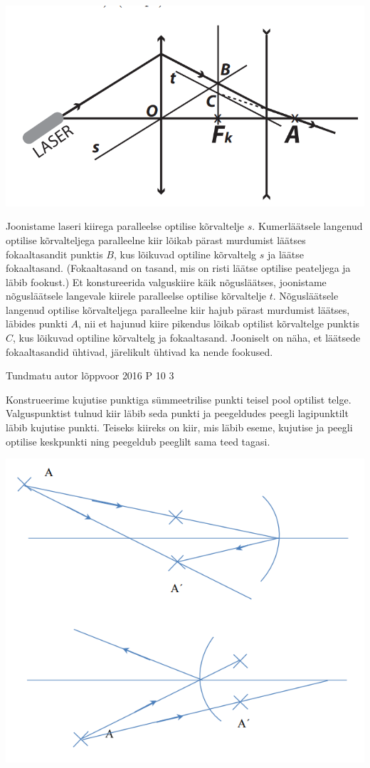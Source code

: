 \documentclass[11pt]{article}
\begin{document}
{{\ifSolution
\begin{center}
	\includegraphics[width=0.5\linewidth]{2016-v2p-08-lah.PNG}
\end{center}
Joonistame laseri kiirega paralleelse optilise kõrvaltelje $s$. Kumerläätsele langenud optilise kõrvalteljega paralleelne kiir lõikab pärast murdumist läätses fokaaltasandit punktis $B$, kus lõikuvad optiline kõrvaltelg $s$ ja läätse fokaaltasand. (Fokaaltasand on tasand, mis on risti läätse optilise peateljega ja läbib fookust.) Et konstureerida valguskiire käik nõgusläätses, joonistame nõgusläätsele langevale kiirele paralleelse optilise kõrvaltelje $t$. Nõgusläätsele langenud optilise kõrvalteljega paralleelne kiir hajub pärast murdumist läätses, läbides punkti $A$, nii et hajunud kiire pikendus lõikab optilist kõrvaltelge punktis $C$, kus lõikuvad optiline kõrvaltelg ja fokaaltasand. Jooniselt on näha, et läätsede fokaaltasandid ühtivad, järelikult ühtivad ka nende fookused.
\fi
}


{Tundmatu autor} %
{lõppvoor} %
{2016} %
{P 10} %
{3} %
{

\ifSolution
Konstrueerime kujutise punktiga sümmeetrilise punkti teisel pool optilist telge. Valguspunktist tulnud kiir läbib seda punkti ja peegeldudes peegli lagipunktilt läbib kujutise punkti. Teiseks kiireks on kiir, mis läbib eseme, kujutise ja peegli optilise keskpunkti ning peegeldub peeglilt sama teed tagasi.
\begin{center}
	\includegraphics[width=0.5\linewidth]{2016-v3p-10-lah.PNG}
\end{center}
\fi
}


}
\end{document}
